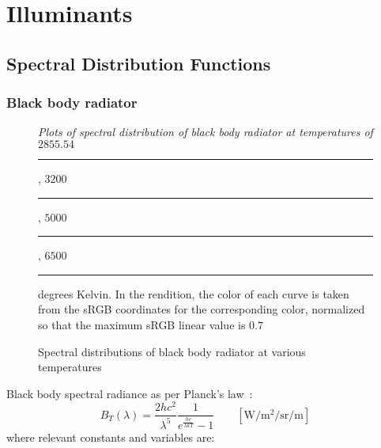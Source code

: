 
\chapter{Illuminants}\label{ch:illuminants}

\section{Spectral Distribution Functions}

\subsection{Black body radiator}

\begin{figure}
{
\small
\centering
{}
\caption{Spectral distributions of black body radiator at various temperatures}
\label{fig:blackbody}
}
\vskip 1mm
{\footnotesize\it Plots of spectral distribution of black body
radiator at temperatures of 
$2855.54$ \textcolor[rgb]{1,0.809228,0.455376}{\rule{1em}{1em}},
$3200$ \textcolor[rgb]{1,0.826374,0.531592}{\rule{1em}{1em}},
$5000$ \textcolor[rgb]{0.95935,0.865267,0.780853}{\rule{1em}{1em}},
$6500$ \textcolor[rgb]{0.897476,0.874411,0.894404}{\rule{1em}{1em}}
degrees Kelvin. 
In the rendition, the color of each curve is taken from the
sRGB coordinates for the corresponding color,
normalized so that the maximum sRGB linear value is $0.7$}
\end{figure}

Black body spectral radiance as per Planck's law~\cite{planck14}:
\begin{equation}
B_T(\lambda) = \frac{2 h c^2}{\lambda^5} \frac 1{e^{\frac{hc}{\lambda k
T}}-1}
\qquad \left[\unit{\watt\per\square\meter\per\steradian\per\meter}\right]
\end{equation}
where relevant constants and variables are:


